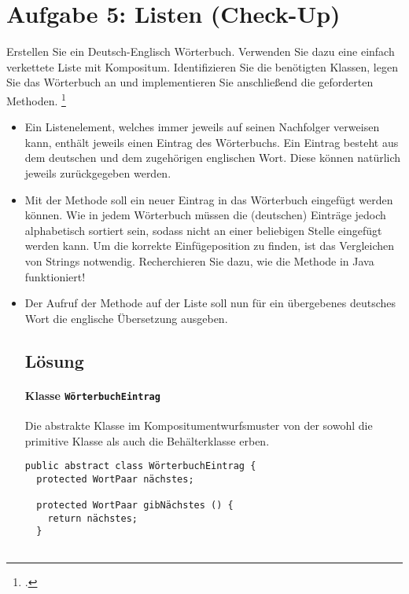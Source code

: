 \documentclass{lehramt-informatik}
\begin{document}
\section{Aufgabe 5: Listen (Check-Up)}

Erstellen Sie ein Deutsch-Englisch Wörterbuch. Verwenden Sie dazu eine
einfach verkettete Liste mit Kompositum. Identifizieren Sie die
benötigten Klassen, legen Sie das Wörterbuch an und implementieren Sie
anschließend die geforderten Methoden.
\footcite[Seite 4, Aufgabe 5]{aud:ab:5}

\begin{itemize}
\item Ein Listenelement, welches immer jeweils auf seinen Nachfolger
verweisen kann, enthält jeweils einen Eintrag des Wörterbuchs. Ein
Eintrag besteht aus dem deutschen und dem zugehörigen englischen Wort.
Diese können natürlich jeweils zurückgegeben werden.

\item Mit der Methode 
soll ein neuer Eintrag in das Wörterbuch eingefügt werden können. Wie in
jedem Wörterbuch müssen die (deutschen) Einträge jedoch alphabetisch
sortiert sein, sodass nicht an einer beliebigen Stelle eingefügt werden
kann. Um die korrekte Einfügeposition zu finden, ist das Vergleichen von
Strings notwendig. Recherchieren Sie dazu, wie die Methode
 in Java funktioniert!

\item Der Aufruf der Methode  auf der
Liste soll nun für ein übergebenes deutsches Wort die englische
Übersetzung ausgeben.

%

\subsection{Lösung}

\paragraph{Klasse \texttt{WörterbuchEintrag}}

Die abstrakte Klasse im Kompositumentwurfsmuster von der sowohl die
primitive Klasse als auch die Behälterklasse erben.

\begin{verbatim}
public abstract class WörterbuchEintrag {
  protected WortPaar nächstes;

  protected WortPaar gibNächstes () {
    return nächstes;
  }


\end{verbatim}
\end{itemize}
\end{document}
